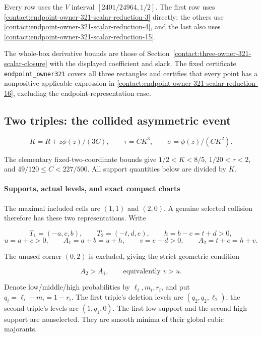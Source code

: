 Every row uses the $V$ interval $[2401/24964,1/2]$. The first row uses
\eqref{contact:endpoint-owner-321-scalar-reduction-3} directly; the others use \eqref{contact:endpoint-owner-321-scalar-reduction-4}, and the last also uses \eqref{contact:endpoint-owner-321-scalar-reduction-15}.

The whole-box derivative bounds are those of
Section~\ref{contact:three-owner-321-scalar-closure} with
the displayed coefficient and slack.
The fixed certificate \texttt{endpoint\_owner321} covers all three
rectangles and certifies that every point has a nonpositive applicable
expression in \eqref{contact:endpoint-owner-321-scalar-reduction-16},
excluding the endpoint-representation case.

\subsection{Two triples: the collided asymmetric event}\label{contact:two-triple-collision-221-reduction}


\[
 K=R+z\phi(z)/(3C),\qquad \tau=CK^3,
 \qquad \sigma=\phi(z)/(CK^2).
\]

The elementary fixed-two-coordinate bounds give
$1/2<K<8/5$, $1/20<\tau<2$, and $49/120\le C<227/500$.
All support quantities below are divided by $K$.

\paragraph{Supports, actual levels, and exact compact charts}

The maximal included cells are $(1,1)$ and $(2,0)$. A genuine selected
collision therefore has these two representations. Write

\[
 T_1=(-a,c,b),\qquad T_2=(-t,d,e),
 \qquad h=b-c=t+d>0,
\]
\[
 u=a+c>0,\qquad A_1=a+b=u+h,
 \qquad v=e-d>0,\qquad A_2=t+e=h+v.
\tag{B.31.1}\label{contact:two-triple-collision-221-reduction-1}
\]

The unused corner $(0,2)$ is excluded, giving the strict geometric condition

\[
 A_2>A_1,\qquad\text{equivalently }v>u.
\tag{B.31.2}\label{contact:two-triple-collision-221-reduction-2}
\]

Denote low/middle/high probabilities by $\ell_i,m_i,r_i$, and put
$q_i=\ell_i+m_i=1-r_i$. The first triple's deletion levels are
$(q_2,q_2,\ell_2)$; the second triple's levels are $(1,q_1,0)$.
The first low support and the second high support are nonselected. They are
smooth minima of their global cubic majorants.


